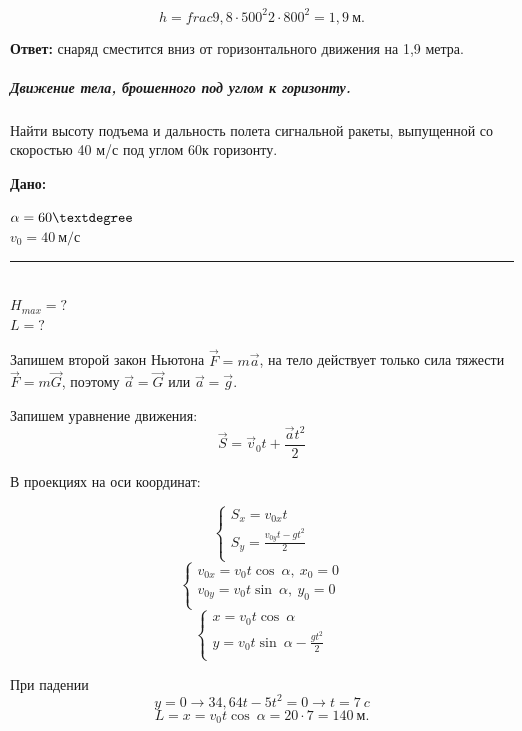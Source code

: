 \documentclass[a6paper, 11pt]{diss_4}
\newcommand{\TNF}{$\vec{F}=m\vec{a}$}
\renewcommand{\'}{\,'}
\newcommand{\UDV}{\vec{S}=\vec{v}_0t+\frac{\vec{a}t^2}{2}}
\begin{document}
\[
h=frac{9,8\cdot500^2}{2\cdot800^2}=1,9\ м.
\]

\textbf{Ответ:} снаряд сместится вниз от горизонтального движения на 1,9 метра.


\subparagraph{Движение тела, брошенного под углом к горизонту.}

Найти высоту подъема и дальность полета сигнальной ракеты, выпущенной со скоростью 40 м/с  под углом  60\textdegree  к горизонту.

\hspace{1cm}\textbf{Дано:}\hspace{.3cm}
\parbox[t]{4cm}{
$\alpha=60\textdegree$\\
$v_0 = 40\ м/с$\\
\rule{4cm}{.4pt}\\
$H_{max} = ?$\\
$L = ?$
}


Запишем второй закон Ньютона \TNF, на тело действует только сила тяжести $\vec{F}=m\vec{G}$, поэтому $\vec{a}=\vec{G}$
или $\vec{a}=\vec{g}$.

Запишем уравнение движения:
\[
\UDV
\]

В проекциях на оси координат:

\begin{equation*}
     \left\{
          \begin{array}{lr}
 S_x=v_{0x}t\\
 S_y=\frac{v_{0y}t-gt^2}{2}\\
          \end{array}
     \right.
\end{equation*}
\begin{equation*}
     \left\{
          \begin{array}{lr}
v_{0x}=v_0t\cos\ \alpha,\ x_0=0\\
v_{0y}=v_0t\sin\ \alpha,\ y_0=0\\
          \end{array}
     \right.
\end{equation*}
\begin{equation*}
     \left\{
          \begin{array}{lr}
x=v_0t\cos\ \alpha\\
y=v_0t\sin\ \alpha-\frac{gt^2}{2}\\
          \end{array}
     \right.
\end{equation*}

При падении
\[
y=0\to
34,64t-5t^2=0\to
t=7\ c
\]
\[
L=x=v_0t\cos\ \alpha=20\cdot7=140\ м.
\]
\end{document}
